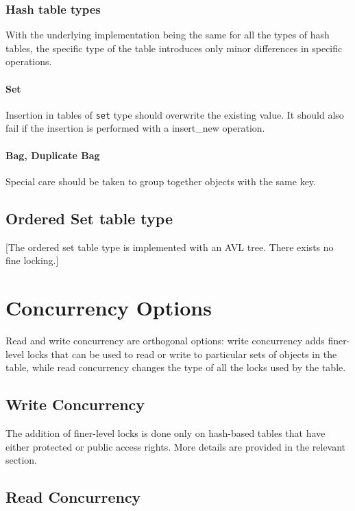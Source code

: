 \documentclass[aps,pre,preprint,nofootinbib]{revtex4}
\begin{document}
\subsubsection{Hash table types}     %

With the underlying implementation being the same for all the types of hash tables, the specific type of the table introduces only minor differences in specific operations.

\paragraph{Set}

Insertion in tables of \verb|set| type should overwrite the existing value.
It should also fail if the insertion is performed with a insert\_new operation.

\paragraph{Bag, Duplicate Bag}

Special care should be taken to group together objects with the same key.

\subsection{Ordered Set table type}

[The ordered set table type is implemented with an AVL tree.
There exists no fine locking.]

\section{Concurrency Options} \label{sec:concurrency_options}

Read and write concurrency are orthogonal options:
write concurrency adds finer-level locks that can be used to read or write to particular sets of objects in the table, while read concurrency changes the type of all the locks used by the table.

\subsection{Write Concurrency}

The addition of finer-level locks is done only on hash-based tables that have either protected or public access rights.
More details are provided in the relevant section.

\subsection{Read Concurrency}
\end{document}
